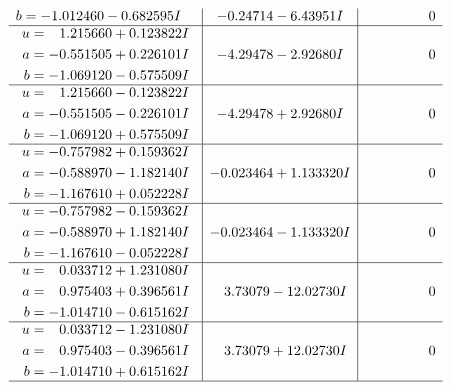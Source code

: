 \documentclass[1p]{elsarticle_modified}
\theoremstyle{definition}
\begin{document}
$$\begin{array}{c|c|c}
\begin{aligned}
b &= -1.012460 - 0.682595 I\end{aligned}
 & -0.24714 - 6.43951 I & \phantom{-0.000000 } 0 \\ \hline\begin{aligned}
u &= \phantom{-}1.215660 + 0.123822 I \\
a &= -0.551505 + 0.226101 I \\
b &= -1.069120 - 0.575509 I\end{aligned}
 & -4.29478 - 2.92680 I & \phantom{-0.000000 } 0 \\ \hline\begin{aligned}
u &= \phantom{-}1.215660 - 0.123822 I \\
a &= -0.551505 - 0.226101 I \\
b &= -1.069120 + 0.575509 I\end{aligned}
 & -4.29478 + 2.92680 I & \phantom{-0.000000 } 0 \\ \hline\begin{aligned}
u &= -0.757982 + 0.159362 I \\
a &= -0.588970 - 1.182140 I \\
b &= -1.167610 + 0.052228 I\end{aligned}
 & -0.023464 + 1.133320 I & \phantom{-0.000000 } 0 \\ \hline\begin{aligned}
u &= -0.757982 - 0.159362 I \\
a &= -0.588970 + 1.182140 I \\
b &= -1.167610 - 0.052228 I\end{aligned}
 & -0.023464 - 1.133320 I & \phantom{-0.000000 } 0 \\ \hline\begin{aligned}
u &= \phantom{-}0.033712 + 1.231080 I \\
a &= \phantom{-}0.975403 + 0.396561 I \\
b &= -1.014710 - 0.615162 I\end{aligned}
 & \phantom{-}3.73079 - 12.02730 I & \phantom{-0.000000 } 0 \\ \hline\begin{aligned}
u &= \phantom{-}0.033712 - 1.231080 I \\
a &= \phantom{-}0.975403 - 0.396561 I \\
b &= -1.014710 + 0.615162 I\end{aligned}
 & \phantom{-}3.73079 + 12.02730 I & \phantom{-0.000000 } 0\\
 \hline 
 \end{array}$$\newpage$$\begin{array}{c|c|c}  

\end{array}$$
\end{document}
